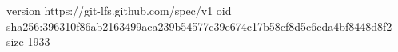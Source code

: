 version https://git-lfs.github.com/spec/v1
oid sha256:396310f86ab2163499aca239b54577c39e674c17b58cf8d5c6cda4bf8448d8f2
size 1933
